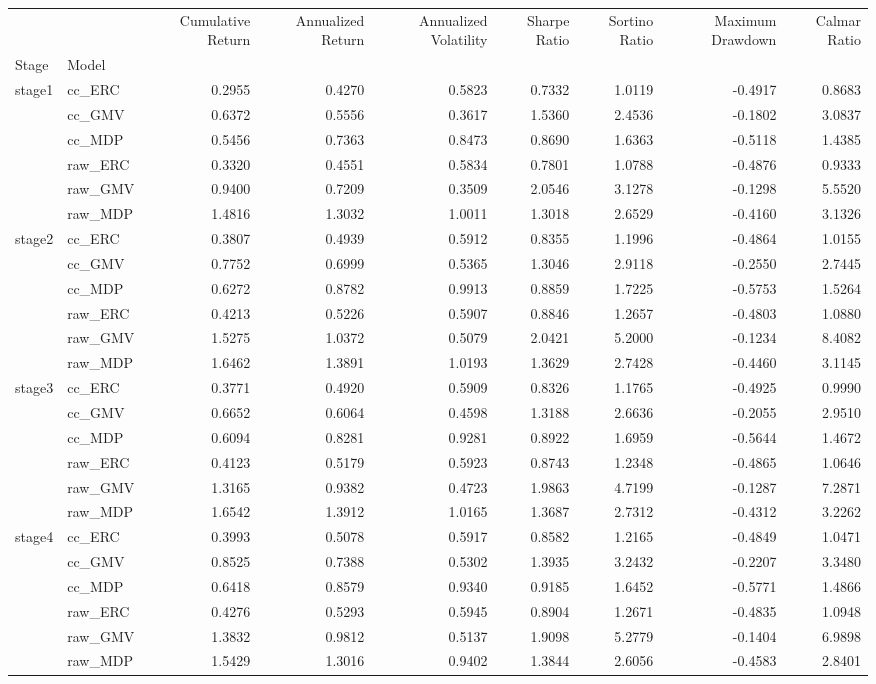 \begin{tabular}{llrrrrrrr}
\toprule
 &  & Cumulative Return & Annualized Return & Annualized Volatility & Sharpe Ratio & Sortino Ratio & Maximum Drawdown & Calmar Ratio \\
Stage & Model &  &  &  &  &  &  &  \\
\midrule
\multirow[t]{6}{*}{stage1} & cc_ERC & 0.2955 & 0.4270 & 0.5823 & 0.7332 & 1.0119 & -0.4917 & 0.8683 \\
 & cc_GMV & 0.6372 & 0.5556 & 0.3617 & 1.5360 & 2.4536 & -0.1802 & 3.0837 \\
 & cc_MDP & 0.5456 & 0.7363 & 0.8473 & 0.8690 & 1.6363 & -0.5118 & 1.4385 \\
 & raw_ERC & 0.3320 & 0.4551 & 0.5834 & 0.7801 & 1.0788 & -0.4876 & 0.9333 \\
 & raw_GMV & 0.9400 & 0.7209 & 0.3509 & 2.0546 & 3.1278 & -0.1298 & 5.5520 \\
 & raw_MDP & 1.4816 & 1.3032 & 1.0011 & 1.3018 & 2.6529 & -0.4160 & 3.1326 \\
\cline{1-9}
\multirow[t]{6}{*}{stage2} & cc_ERC & 0.3807 & 0.4939 & 0.5912 & 0.8355 & 1.1996 & -0.4864 & 1.0155 \\
 & cc_GMV & 0.7752 & 0.6999 & 0.5365 & 1.3046 & 2.9118 & -0.2550 & 2.7445 \\
 & cc_MDP & 0.6272 & 0.8782 & 0.9913 & 0.8859 & 1.7225 & -0.5753 & 1.5264 \\
 & raw_ERC & 0.4213 & 0.5226 & 0.5907 & 0.8846 & 1.2657 & -0.4803 & 1.0880 \\
 & raw_GMV & 1.5275 & 1.0372 & 0.5079 & 2.0421 & 5.2000 & -0.1234 & 8.4082 \\
 & raw_MDP & 1.6462 & 1.3891 & 1.0193 & 1.3629 & 2.7428 & -0.4460 & 3.1145 \\
\cline{1-9}
\multirow[t]{6}{*}{stage3} & cc_ERC & 0.3771 & 0.4920 & 0.5909 & 0.8326 & 1.1765 & -0.4925 & 0.9990 \\
 & cc_GMV & 0.6652 & 0.6064 & 0.4598 & 1.3188 & 2.6636 & -0.2055 & 2.9510 \\
 & cc_MDP & 0.6094 & 0.8281 & 0.9281 & 0.8922 & 1.6959 & -0.5644 & 1.4672 \\
 & raw_ERC & 0.4123 & 0.5179 & 0.5923 & 0.8743 & 1.2348 & -0.4865 & 1.0646 \\
 & raw_GMV & 1.3165 & 0.9382 & 0.4723 & 1.9863 & 4.7199 & -0.1287 & 7.2871 \\
 & raw_MDP & 1.6542 & 1.3912 & 1.0165 & 1.3687 & 2.7312 & -0.4312 & 3.2262 \\
\cline{1-9}
\multirow[t]{6}{*}{stage4} & cc_ERC & 0.3993 & 0.5078 & 0.5917 & 0.8582 & 1.2165 & -0.4849 & 1.0471 \\
 & cc_GMV & 0.8525 & 0.7388 & 0.5302 & 1.3935 & 3.2432 & -0.2207 & 3.3480 \\
 & cc_MDP & 0.6418 & 0.8579 & 0.9340 & 0.9185 & 1.6452 & -0.5771 & 1.4866 \\
 & raw_ERC & 0.4276 & 0.5293 & 0.5945 & 0.8904 & 1.2671 & -0.4835 & 1.0948 \\
 & raw_GMV & 1.3832 & 0.9812 & 0.5137 & 1.9098 & 5.2779 & -0.1404 & 6.9898 \\
 & raw_MDP & 1.5429 & 1.3016 & 0.9402 & 1.3844 & 2.6056 & -0.4583 & 2.8401 \\
\cline{1-9}
\bottomrule
\end{tabular}

